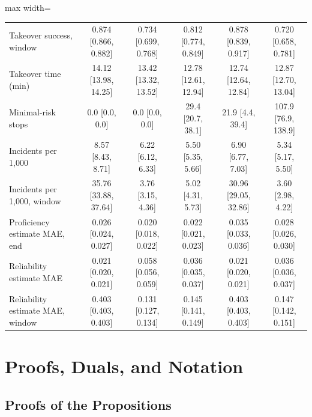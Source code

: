\documentclass[utf8]{frontiers_suppmat}
\begin{document}
\begin{table}[!htbp]
\begin{adjustbox}{max width=\textwidth}
\begin{tabular}{@{}lccccc@{}}
Takeover success, window & 0.874 [0.866, 0.882] & 0.734 [0.699, 0.768] & 0.812 [0.774, 0.849] & 0.878 [0.839, 0.917] & 0.720 [0.658, 0.781]\\
Takeover time (min) & 14.12 [13.98, 14.25] & 13.42 [13.32, 13.52] & 12.78 [12.61, 12.94] & 12.74 [12.64, 12.84] & 12.87 [12.70, 13.04]\\
Minimal-risk stops & 0.0 [0.0, 0.0] & 0.0 [0.0, 0.0] & 29.4 [20.7, 38.1] & 21.9 [4.4, 39.4] & 107.9 [76.9, 138.9]\\
Incidents per 1,000 & 8.57 [8.43, 8.71] & 6.22 [6.12, 6.33] & 5.50 [5.35, 5.66] & 6.90 [6.77, 7.03] & 5.34 [5.17, 5.50]\\
Incidents per 1,000, window & 35.76 [33.88, 37.64] & 3.76 [3.15, 4.36] & 5.02 [4.31, 5.73] & 30.96 [29.05, 32.86] & 3.60 [2.98, 4.22]\\
Proficiency estimate MAE, end & 0.026 [0.024, 0.027] & 0.020 [0.018, 0.022] & 0.022 [0.021, 0.023] & 0.035 [0.033, 0.036] & 0.028 [0.026, 0.030]\\
Reliability estimate MAE & 0.021 [0.020, 0.021] & 0.058 [0.056, 0.059] & 0.036 [0.035, 0.037] & 0.021 [0.020, 0.021] & 0.036 [0.036, 0.037]\\
Reliability estimate MAE, window & 0.403 [0.403, 0.403] & 0.131 [0.127, 0.134] & 0.145 [0.141, 0.149] & 0.403 [0.403, 0.403] & 0.147 [0.142, 0.151]\\
		\bottomrule
	\end{tabular}
	\end{adjustbox}
\end{table}

\section{Proofs, Duals, and Notation}
\label{app:proofs}

\subsection{Proofs of the Propositions}
\label{app:proofs-props}
\end{document}
